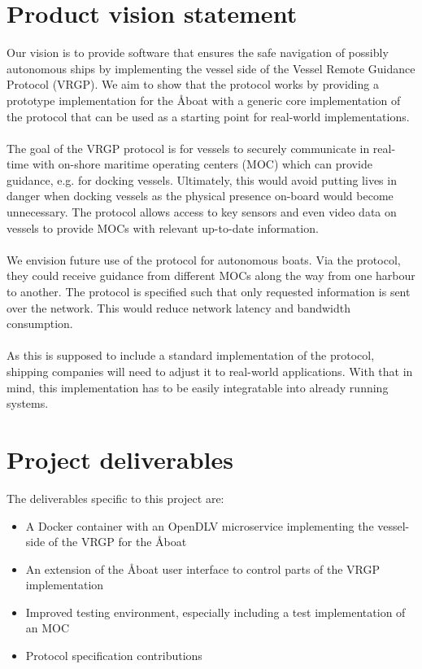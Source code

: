 \section{Product vision statement}\label{sec:vision}

Our vision is to provide software that ensures the safe navigation of possibly autonomous ships by implementing the vessel side of the Vessel Remote Guidance Protocol (VRGP). We aim to show that the protocol works by providing a prototype implementation for the Åboat with a generic core implementation of the protocol that can be used as a starting point for real-world implementations.
\\\\
The goal of the VRGP protocol is for vessels to securely communicate in real-time with on-shore maritime operating centers (MOC) which can provide guidance, e.g. for docking vessels. Ultimately, this would avoid putting lives in danger when docking vessels as the physical presence on-board would become unnecessary. The protocol allows access to key sensors and even video data on vessels to provide MOCs with relevant up-to-date information.
\\\\
We envision future use of the protocol for autonomous boats. Via the protocol, they could receive guidance from different MOCs along the way from one harbour to another. The protocol is specified such that only requested information is sent over the network. This would reduce network latency and bandwidth consumption.
\\\\
As this is supposed to include a standard implementation of the protocol, shipping companies will need to adjust it to real-world applications. With that in mind, this implementation has to be easily integratable into already running systems.

\section{Project deliverables}\label{sec:deliverables}

The deliverables specific to this project are:

\begin{itemize}
	\item A Docker container with an OpenDLV microservice implementing the vessel-side of the VRGP for the Åboat
	\item An extension of the Åboat user interface to control parts of the VRGP implementation
	\item Improved testing environment, especially including a test implementation of an MOC
	\item Protocol specification contributions
\end{itemize}

